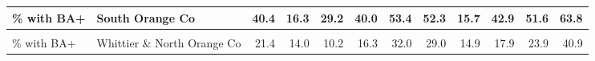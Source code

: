 \begin{table}[!h]
\begin{tabular}[t]{l|>{}l||r|r|r|r|r|r|r|r|r|r}
\hline
\% with BA+ & South Orange Co & 40.4 & 16.3 & 29.2 & 40.0 & 53.4 & 52.3 & 15.7 & 42.9 & 51.6 & 63.8\\
\hline
\cellcolor{gray!6}{\% with BA+} & \cellcolor{gray!6}{West Los Angeles \& West Beach} & \cellcolor{gray!6}{50.6} & \cellcolor{gray!6}{16.7} & \cellcolor{gray!6}{42.3} & \cellcolor{gray!6}{53.4} & \cellcolor{gray!6}{62.7} & \cellcolor{gray!6}{65.6} & \cellcolor{gray!6}{14.4} & \cellcolor{gray!6}{60.1} & \cellcolor{gray!6}{67.9} & \cellcolor{gray!6}{74.6}\\
\hline
\% with BA+ & Whittier \& North Orange Co & 21.4 & 14.0 & 10.2 & 16.3 & 32.0 & 29.0 & 14.9 & 17.9 & 23.9 & 40.9\\
\hline
\end{tabular}
\end{table}

